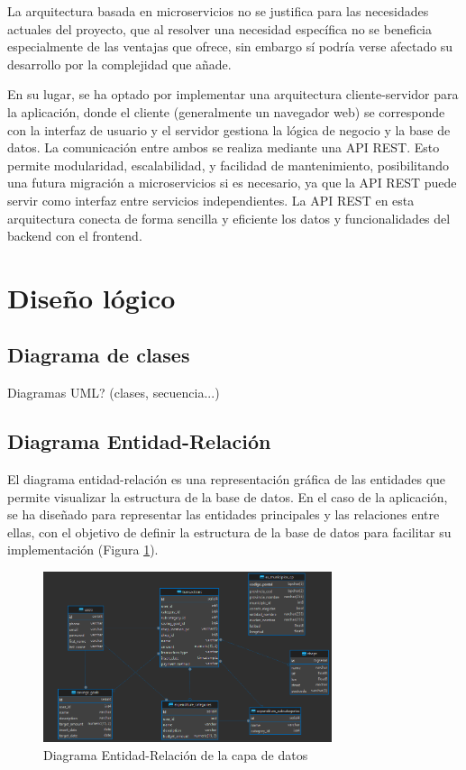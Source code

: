La arquitectura basada en microservicios no se justifica para las necesidades actuales del proyecto, que al resolver una necesidad específica no se beneficia especialmente de las ventajas que ofrece, sin embargo sí podría verse afectado su desarrollo por la complejidad que añade. 

En su lugar, se ha optado por implementar una arquitectura cliente-servidor para la aplicación, donde el cliente (generalmente un navegador web) se corresponde con la interfaz de usuario y el servidor gestiona la lógica de negocio y la base de datos. La comunicación entre ambos se realiza mediante una API REST. Esto permite modularidad, escalabilidad, y facilidad de mantenimiento, posibilitando una futura migración a microservicios si es necesario, ya que la API REST puede servir como interfaz entre servicios independientes. La API REST en esta arquitectura conecta de forma sencilla y eficiente los datos y funcionalidades del backend con el frontend.

\section{Diseño lógico}


\subsection{Diagrama de clases}
Diagramas UML? (clases, secuencia...)

\subsection{Diagrama Entidad-Relación}
El diagrama entidad-relación es una representación gráfica de las entidades que permite visualizar la estructura de la base de datos. En el caso de la aplicación, se ha diseñado para representar las entidades principales y las relaciones entre ellas, con el objetivo de definir la estructura de la base de datos para facilitar su implementación (Figura \ref{fig:diagrama_ER}).

\begin{figure}[ht!]
    \centering
    \includegraphics[height=50mm]{imagenes/diagrama_ER.png}
    \caption{Diagrama Entidad-Relación de la capa de datos}
    \label{fig:diagrama_ER}
\end{figure}


